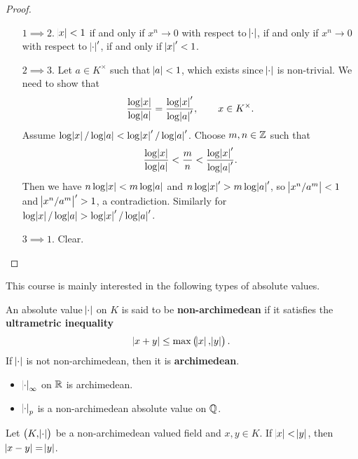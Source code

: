 \begin{proof}
\hfill
\begin{itemize}[leftmargin=0.5in]
\item[$ 1 \implies 2 $.] $ \abs{x} < 1 $ if and only if $ x^n \to 0 $ with respect to $ \abs{\cdot} $, if and only if $ x^n \to 0 $ with respect to $ \abs{\cdot}' $, if and only if $ \abs{x}' < 1 $.
\item[$ 2 \implies 3 $.] Let $ a \in K^\times $ such that $ \abs{a} < 1 $, which exists since $ \abs{\cdot} $ is non-trivial. We need to show that
$$ \dfrac{\log \abs{x}}{\log \abs{a}} = \dfrac{\log \abs{x}'}{\log \abs{a}'}, \qquad x \in K^\times. $$
Assume $ \log \abs{x} / \log \abs{a} < \log \abs{x}' / \log \abs{a}' $. Choose $ m, n \in \mathbb{Z} $ such that
$$ \dfrac{\log \abs{x}}{\log \abs{a}} < \dfrac{m}{n} < \dfrac{\log \abs{x}'}{\log \abs{a}'}. $$
Then we have $ n\log \abs{x} < m\log \abs{a} $ and $ n\log \abs{x}' > m\log \abs{a}' $, so $ \abs{x^n / a^m} < 1 $ and $ \abs{x^n / a^m}' > 1 $, a contradiction. Similarly for $ \log \abs{x} / \log \abs{a} > \log \abs{x}' / \log \abs{a}' $.
\item[$ 3 \implies 1 $.] Clear.
\end{itemize}
\end{proof}

This course is mainly interested in the following types of absolute values.

\begin{definition}
An absolute value $ \abs{\cdot} $ on $ K $ is said to be \textbf{non-archimedean} if it satisfies the \textbf{ultrametric inequality}
$$ \abs{x + y} \le \max\br{\abs{x}, \abs{y}}. $$
If $ \abs{\cdot} $ is not non-archimedean, then it is \textbf{archimedean}.
\end{definition}

\begin{example*}
\hfill
\begin{itemize}
\item $ \abs{\cdot}_\infty $ on $ \mathbb{R} $ is archimedean.
\item $ \abs{\cdot}_p $ is a non-archimedean absolute value on $ \mathbb{Q} $.
\end{itemize}
\end{example*}

\begin{lemma}
Let $ \br{K, \abs{\cdot}} $ be a non-archimedean valued field and $ x, y \in K $. If $ \abs{x} < \abs{y} $, then $ \abs{x - y} = \abs{y} $.
\end{lemma}

